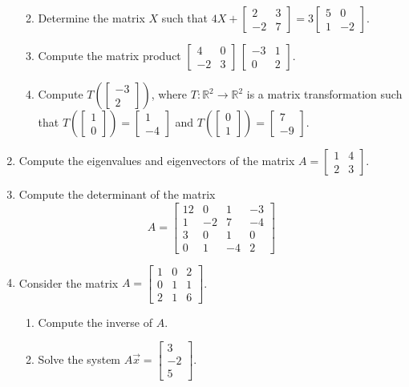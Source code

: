 \documentclass[12pt]{article}
\newcommand{\points}[1]{\marginpar{\hspace{24pt}[#1]}}
\newcommand{\R}{\mathbb{R}}
\newcommand{\bbm}{\begin{bmatrix}}
\newcommand{\ebm}{\end{bmatrix}}
\begin{document}
\begin{enumerate}
\begin{enumerate}
\vspace{1.75in}

 \item Determine the matrix $X$ such that $4X+\bbm 2&3\\-2&7\ebm = 3\bbm 5&0\\1&-2\ebm$. \points{3}

\vspace{1.75in}

 \item Compute the matrix product $\bbm 4&0\\-2&3\ebm \, \bbm -3&1\\0&2\ebm$. \points{3}

\vspace{1.75in}

 \item Compute $T\left(\bbm -3\\2\ebm\right)$, where $T:\R^2\to \R^2$ is a matrix transformation such that $T\left(\bbm 1\\0\ebm\right) = \bbm 1\\-4\ebm$ and $T\left(\bbm 0\\1\ebm\right) = \bbm 7\\-9\ebm$. \points{2}

\end{enumerate}
\newpage

\item Compute the eigenvalues and eigenvectors of the matrix $A = \bbm 1&4\\2&3\ebm$. \points{9}

\newpage

\item Compute the determinant of the matrix \points{8}
\[
 A = \bbm 12 & 0 & 1 & -3\\1&-2&7&-4\\3&0&1&0\\0&1&-4&2\ebm
\]

\newpage

\item Consider the matrix $A = \bbm 1&0&2\\0&1&1\\2&1&6\ebm$.
\begin{enumerate}
 \item Compute the inverse of $A$.\points{6}

\vspace{5in}

 \item Solve the system $A\vec{x} = \bbm 3\\-2\\5\ebm$. \points{3}
\end{enumerate}


\end{enumerate}
\end{document}
